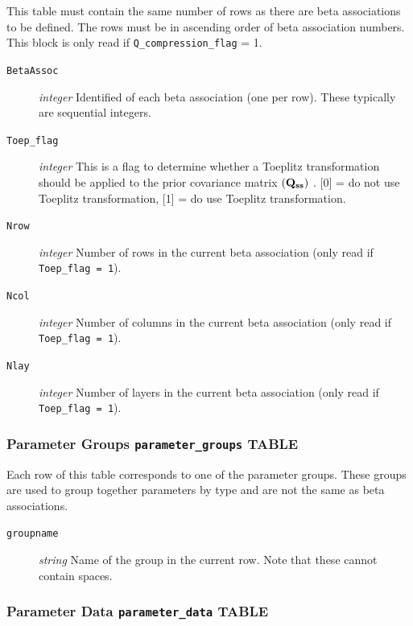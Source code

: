 \documentclass[11pt,oneside,onecolumn]{usgsreport}
\begin{document}
\begin{appendix}
\begin{bibunit}
This table must contain the same number of rows as there are beta
associations to be defined. The rows must be in ascending order of
beta association numbers. This block is only read if \texttt{Q\_compression\_flag}
= 1.
\begin{description}
\item [{\texttt{BetaAssoc}}] \emph{integer }Identified of each beta association
(one per row). These typically are sequential integers.
\item [{\texttt{Toep\_flag}}] \emph{integer} This is a flag to determine
whether a Toeplitz transformation should be applied to the prior covariance
matrix $\mbox{\ensuremath{\left(\mathbf{Q_{ss}}\right)} }$. {[}0{]}
= do not use Toeplitz transformation, {[}1{]} = do use Toeplitz transformation.
\item [{\texttt{Nrow}}] \emph{integer }Number of rows in the current beta
association (only read if \texttt{Toep\_flag = 1}).
\item [{\texttt{Ncol}}] \emph{integer }Number of columns in the current
beta association (only read if \texttt{Toep\_flag = 1}).
\item [{\texttt{Nlay}}] \emph{integer }Number of layers in the current
beta association (only read if \texttt{Toep\_flag = 1}).
\end{description}

\subsubsection{Parameter Groups \texttt{parameter\_groups} TABLE}

Each row of this table corresponds to one of the parameter groups.
These groups are used to group together parameters by type and are
not the same as beta associations.
\begin{description}
\item [{\texttt{groupname}}] \emph{string} Name of the group in the current
row. Note that these cannot contain spaces.
\end{description}

\subsubsection{Parameter Data \texttt{parameter\_data} TABLE}


\end{bibunit}
\end{appendix}
\end{document}
